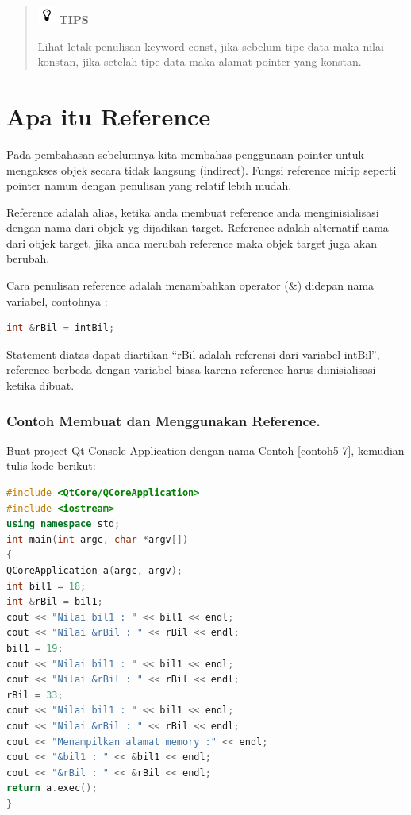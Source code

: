 \begin{quotation}
\includegraphics{../manuscript/images/tips.png}	\textbf{TIPS}
	
	Lihat
	letak penulisan keyword const, jika sebelum tipe data maka nilai
	konstan, jika setelah tipe data maka alamat pointer yang konstan.
\end{quotation}
 

\section{Apa itu Reference}\label{apa-itu-reference}

Pada pembahasan sebelumnya kita membahas penggunaan pointer untuk
mengakses objek secara tidak langsung (indirect). Fungsi reference mirip
seperti pointer namun dengan penulisan yang relatif lebih mudah.

Reference adalah alias, ketika anda membuat reference anda
menginisialisasi dengan nama dari objek yg dijadikan target. Reference
adalah alternatif nama dari objek target, jika anda merubah reference
maka objek target juga akan berubah.

Cara penulisan reference adalah menambahkan operator (\&) didepan nama
variabel, contohnya :

\begin{lstlisting}[language=c++, numbers=none]
int &rBil = intBil;
\end{lstlisting}

Statement diatas dapat diartikan ``rBil adalah referensi dari variabel
intBil'', reference berbeda dengan variabel biasa karena reference harus
diinisialisasi ketika dibuat.

\subsubsection*{Contoh  Membuat dan Menggunakan Reference.}

Buat project Qt Console Application dengan nama Contoh \ref{contoh5-7}, kemudian tulis
kode berikut:

\begin{lstlisting}[language=c++, caption=Membuat dan Menggunakan Reference, label=contoh5-7]
#include <QtCore/QCoreApplication>
#include <iostream>
using namespace std;
int main(int argc, char *argv[])
{
QCoreApplication a(argc, argv);
int bil1 = 18;
int &rBil = bil1;
cout << "Nilai bil1 : " << bil1 << endl;
cout << "Nilai &rBil : " << rBil << endl;
bil1 = 19;
cout << "Nilai bil1 : " << bil1 << endl;
cout << "Nilai &rBil : " << rBil << endl;
rBil = 33;
cout << "Nilai bil1 : " << bil1 << endl;
cout << "Nilai &rBil : " << rBil << endl;
cout << "Menampilkan alamat memory :" << endl;
cout << "&bil1 : " << &bil1 << endl;
cout << "&rBil : " << &rBil << endl;
return a.exec();
}
\end{lstlisting}


